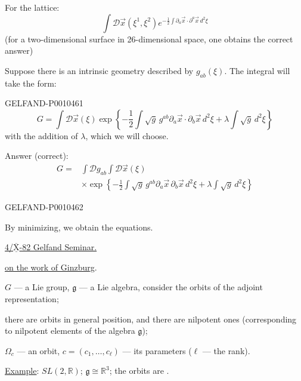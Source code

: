 For the lattice:
\begin{equation*}
\int\mathcal{D}\vec{x}(\xi^1,\xi^2)
e^{-\frac12\int\partial_a\vec{x}\cdot\partial^a\vec{x}\,d^2\xi}
\tag{26}
\end{equation*}
(for a two-dimensional surface in 26-dimensional space, one obtains the correct answer)

Suppose there is an intrinsic geometry described by $g_{ab}(\xi)$. The integral will take the form:


\begin{GelfandAdjacentEvidence}{GELFAND-P001046}{1}
\begin{equation*}
G=\int\mathcal D\vec{x}(\xi)
\exp\left\{-\frac12\int\sqrt{g}\,g^{ab}\partial_a\vec{x}\cdot\partial_b\vec{x}\,d^2\xi
+\lambda\int\sqrt{g}\,d^2\xi\right\}
\tag{27}
\end{equation*}
with the addition of $\lambda$, which we will choose.

Answer (correct):
\begin{equation*}
\begin{aligned}
G={}&\int\mathcal Dg_{ab}\int\mathcal D\vec{x}(\xi)\\
&\times\exp\left\{-\frac12\int\sqrt{g}\,g^{ab}\partial_a\vec{x}\,\partial_b\vec{x}\,d^2\xi
+\lambda\int\sqrt{g}\,d^2\xi\right\}
\end{aligned}
\tag{28}
\end{equation*}
\end{GelfandAdjacentEvidence}
\begin{GelfandAdjacentEvidence}{GELFAND-P001046}{2}


By minimizing, we obtain the equations.

\medskip
\underline{4/$\overline{\underline{\mathrm{X}}}$-82 {}}\quad\underline{Gelfand Seminar.}

\underline{ on the work of Ginzburg}.

$G$ — a Lie group, $\mathfrak g$ — a Lie algebra, consider the orbits of the adjoint representation;

there are orbits in general position, and there are nilpotent ones (corresponding to nilpotent elements of the algebra $\mathfrak g$);

$\Omega_c$ — an orbit, $c=(c_1,\ldots,c_\ell)$ — its parameters ($\ell$ — the rank).

\underline{Example}: $SL(2,\mathbb R)$; $\mathfrak g\cong\mathbb R^3$; the orbits are .
\end{GelfandAdjacentEvidence}
